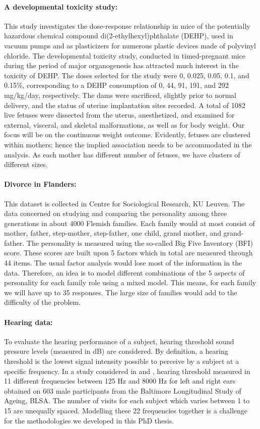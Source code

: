 \documentclass[14pt]{article}
\begin{document}
\paragraph*{A developmental toxicity study:} This study investigates the dose-response
relationship in mice of the potentially hazardous chemical compound di(2-ethylhexyl)phthalate
(DEHP), used in vacuum pumps and as plasticizers for numerous plastic devices made of polyvinyl chloride. The developmental toxicity study, conducted in timed-pregnant
mice during the period of major organogenesis has attracted
much interest in the toxicity of DEHP. The doses selected for the study were 0, 0.025, 0.05, 0.1,
and 0.15\%, corresponding to a DEHP consumption of 0, 44, 91, 191, and 292 mg/kg/day, respectively.
The dams were sacrificed, slightly prior to normal delivery, and the status of uterine implantation sites recorded. A total of 1082 live fetuses were dissected from the uterus, anesthetized, and examined for external, visceral, and skeletal malformations, as well as for body
weight. Our focus will be on the continuous weight outcome. Evidently, fetuses are clustered within mothers; hence the implied association needs to be accommodated in the analysis. As each mother has different number of fetuses, we have clusters of different sizes. 


\paragraph*{Divorce in Flanders:} This dataset is collected in Centre for Sociological Research, KU Leuven. The data concerned on studying and comparing the personality among
three generations in about 4000 Flemish families. Each family would at most consist of mother, father, step-mother, step-father, one child, grand mother, and grand-father. The personality is measured using the so-called
Big Five Inventory (BFI) score. These scores are built upon 5 factors which in total are measured through 44 items. The usual factor analysis would lose most of the information in the data. Therefore, an idea is to model different combinations of the 5 aspects of personality for each family role using a mixed model. This means, for each family we will have up to 35 responses. The large size of families would add to the difficulty of the problem.

\paragraph*{Hearing data:} To evaluate the hearing performance of a subject, hearing threshold sound pressure levels (measured in dB) are considered. By definition, a hearing threshold is the lowest signal intensity possible to perceive by a subject at a specific frequency. In a study considered in \cite{verbeke2009} and \cite{Verbeke2006}, hearing threshold measured in 11 different frequencies between 125 Hz and 8000 Hz for left and right ears obtained on 603 male participants from the Baltimore Longitudinal Study of Ageing, BLSA. The number of visits for each subject which varies between 1 to 15 are unequally spaced. Modelling these 22 frequencies together is a challenge for the methodologies we developed in this PhD thesis.
\end{document}
